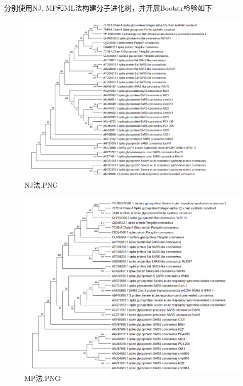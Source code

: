 \documentclass[supercite]{HustGraduPaper}
\begin{document}
	  \paragraph{}\label{subpara:subpara}分别使用NJ, MP和ML法构建分子进化树，并开展Bootstr检验如下
	\begin{figure}[H]
		\centering
		\includegraphics[width=1\textwidth]{./material/practice4/NJ.png}
		\caption{NJ法.PNG}
	\end{figure}
	\begin{figure}[H]
		\centering
		\includegraphics[width=1\textwidth]{./material/practice4/MP.png}
		\caption{MP法.PNG}
	\end{figure}
\end{document}
